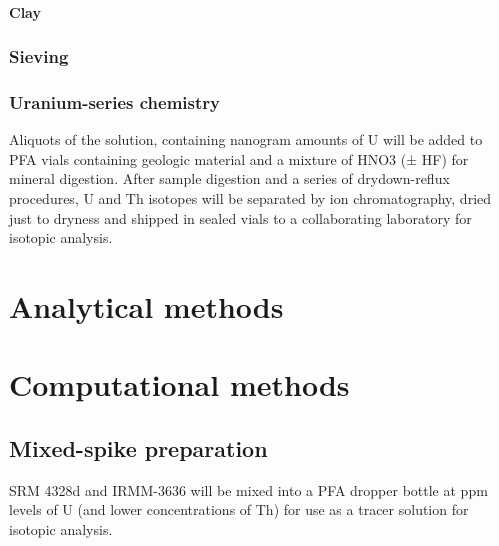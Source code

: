 \documentclass[letterpaper, 12pt, openany]{book}
\begin{document}
\subsection{Clay}

\section{Sieving}

\section{Uranium-series chemistry}


Aliquots of the solution, containing nanogram amounts of U will be added to PFA vials containing geologic material and a mixture of HNO3 (± HF) for mineral digestion. After sample digestion and a series of drydown-reflux procedures, U and Th isotopes will be separated by ion chromatography, dried just to dryness and shipped in sealed vials to a collaborating laboratory for isotopic analysis.

\part{Analytical methods}



\part{Computational methods}

\appendix 

\chapter{Mixed-spike preparation}

SRM 4328d and IRMM-3636 will be mixed into a PFA dropper bottle at ppm levels of U (and lower concentrations of Th) for use as a tracer solution for isotopic analysis. 

\backmatter
\end{document}
